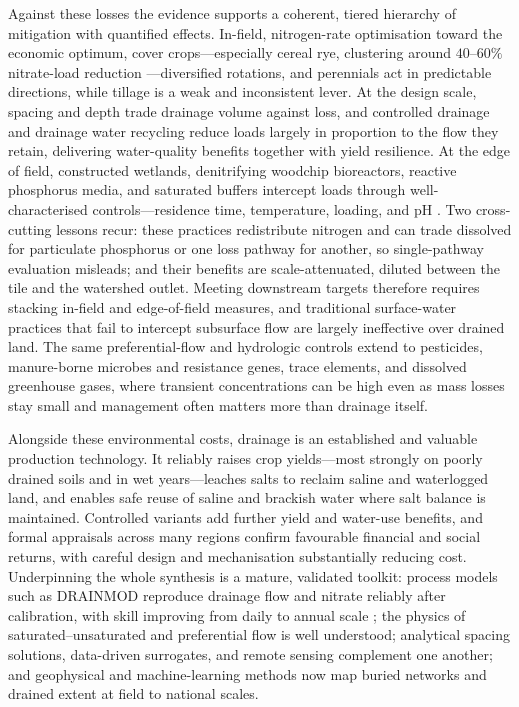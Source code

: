 \documentclass[11pt]{article}
\begin{document}
Against these losses the evidence supports a coherent, tiered hierarchy of
mitigation with quantified effects. In-field, nitrogen-rate optimisation toward
the economic optimum, cover crops---especially cereal rye, clustering around
$40$--$60\%$ nitrate-load reduction \parencite{Malone2018,Malone2014b,Malone2023}---diversified rotations, and perennials act
in predictable directions, while tillage is a weak and inconsistent lever. At
the design scale, spacing and depth trade drainage volume against loss, and
controlled drainage and drainage water recycling reduce loads largely in
proportion to the flow they retain, delivering water-quality benefits together
with yield resilience. At the edge of field, constructed wetlands, denitrifying
woodchip bioreactors, reactive phosphorus media, and saturated buffers
intercept loads through well-characterised controls---residence time,
temperature, loading, and pH \parencite{Christianson2013,Jaynes2008}. Two cross-cutting lessons recur: these practices
redistribute nitrogen and can trade dissolved for particulate phosphorus or one
loss pathway for another, so single-pathway evaluation misleads; and their
benefits are scale-attenuated, diluted between the tile and the watershed
outlet. Meeting downstream targets therefore requires stacking in-field and
edge-of-field measures, and traditional surface-water practices that fail to
intercept subsurface flow are largely ineffective over drained land. The same
preferential-flow and hydrologic controls extend to pesticides, manure-borne
microbes and resistance genes, trace elements, and dissolved greenhouse gases,
where transient concentrations can be high even as mass losses stay small and
management often matters more than drainage itself.

Alongside these environmental costs, drainage is an established and valuable
production technology. It reliably raises crop yields---most strongly on poorly
drained soils and in wet years---leaches salts to reclaim saline and
waterlogged land, and enables safe reuse of saline and brackish water where salt
balance is maintained. Controlled variants add further yield and water-use
benefits, and formal appraisals across many regions confirm favourable
financial and social returns, with careful design and mechanisation
substantially reducing cost. Underpinning the whole synthesis is a mature,
validated toolkit: process models such as \textsc{DRAINMOD} reproduce drainage
flow and nitrate reliably after calibration, with skill improving from daily to
annual scale ; the physics of saturated--unsaturated and preferential flow is
well understood; analytical spacing solutions, data-driven surrogates, and
remote sensing complement one another; and geophysical and machine-learning
methods now map buried networks and drained extent at field to national scales.
\end{document}
